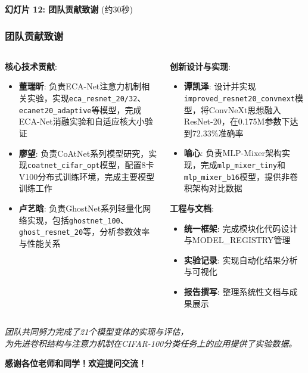 \documentclass[10pt]{beamer}
\begin{document}
\begin{frame}{\textbf{幻灯片 12: 团队贡献致谢} (约30秒)}
\frametitle{团队贡献致谢}

\begin{columns}[T]
    \begin{column}{0.48\textwidth}
        \textbf{核心技术贡献}:
        \begin{itemize}
            \item \textbf{董瑞昕}: 负责ECA-Net注意力机制相关实验，实现\texttt{eca\_resnet\_20/32}、\texttt{ecanet20\_adaptive}等模型，完成ECA-Net消融实验和自适应核大小验证
            \item \textbf{廖望}: 负责CoAtNet系列模型研究，实现\texttt{coatnet\_cifar\_opt}模型，配置8卡V100分布式训练环境，完成主要模型训练工作
            \item \textbf{卢艺晗}: 负责GhostNet系列轻量化网络实现，包括\texttt{ghostnet\_100}、\texttt{ghost\_resnet\_20}等，分析参数效率与性能关系
        \end{itemize}
    \end{column}
    \begin{column}{0.48\textwidth}
        \textbf{创新设计与实现}:
        \begin{itemize}
            \item \textbf{谭凯泽}: 设计并实现\texttt{improved\_resnet20\_convnext}模型，将ConvNeXt思想融入ResNet-20，在0.175M参数下达到72.33\%准确率
            \item \textbf{喻心}: 负责MLP-Mixer架构实现，完成\texttt{mlp\_mixer\_tiny}和\texttt{mlp\_mixer\_b16}模型，提供非卷积架构对比数据
        \end{itemize}
        
        \vspace{0.5em}
        \textbf{工程与文档}:
        \begin{itemize}
            \item \textbf{统一框架}: 完成模块化代码设计与MODEL\_REGISTRY管理
            \item \textbf{实验记录}: 实现自动化结果分析与可视化
            \item \textbf{报告撰写}: 整理系统性文档与成果展示
        \end{itemize}
    \end{column}
\end{columns}

\vspace{0.8em}
\centering
\textit{团队共同努力完成了21个模型变体的实现与评估，\\
为先进卷积结构与注意力机制在CIFAR-100分类任务上的应用提供了实验数据。}

\vspace{0.5em}
\centering
\textbf{感谢各位老师和同学！欢迎提问交流！}

\end{frame}
\end{document}
